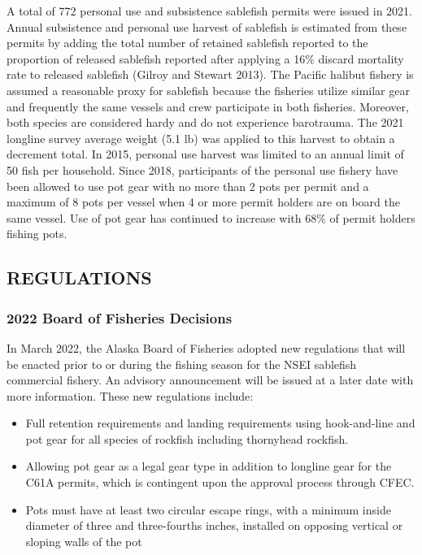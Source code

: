 \documentclass[
]{article}
\providecommand{\tightlist}{%
  \setlength{\itemsep}{0pt}\setlength{\parskip}{0pt}}
\begin{document}
A total of 772 personal use and subsistence sablefish permits were issued in 2021. Annual subsistence and personal use harvest of sablefish is estimated from these permits by adding the total number of retained sablefish reported to the proportion of released sablefish reported after applying a 16\% discard mortality rate to released sablefish (Gilroy and Stewart 2013). The Pacific halibut fishery is assumed a reasonable proxy for sablefish because the fisheries utilize similar gear and frequently the same vessels and crew participate in both fisheries. Moreover, both species are considered hardy and do not experience barotrauma. The 2021 longline survey average weight (5.1 lb) was applied to this harvest to obtain a decrement total.
In 2015, personal use harvest was limited to an annual limit of 50 fish per household. Since 2018, participants of the personal use fishery have been allowed to use pot gear with no more than 2 pots per permit and a maximum of 8 pots per vessel when 4 or more permit holders are on board the same vessel. Use of pot gear has continued to increase with 68\% of permit holders fishing pots.

\hypertarget{regulations}{%
\subsection{REGULATIONS}\label{regulations}}

\hypertarget{board-of-fisheries-decisions}{%
\subsubsection{2022 Board of Fisheries Decisions}\label{board-of-fisheries-decisions}}

In March 2022, the Alaska Board of Fisheries adopted new regulations that will be enacted prior to or during the fishing season for the NSEI sablefish commercial fishery. An advisory announcement will be issued at a later date with more information. These new regulations include:

\begin{itemize}
\tightlist
\item
  Full retention requirements and landing requirements using hook-and-line and pot gear for all species of rockfish including thornyhead rockfish.
\item
  Allowing pot gear as a legal gear type in addition to longline gear for the C61A permits, which is contingent upon the approval process through CFEC.
\item
  Pots must have at least two circular escape rings, with a minimum inside diameter of three and three-fourths inches, installed on opposing vertical or sloping walls of the pot
\end{itemize}
\end{document}
